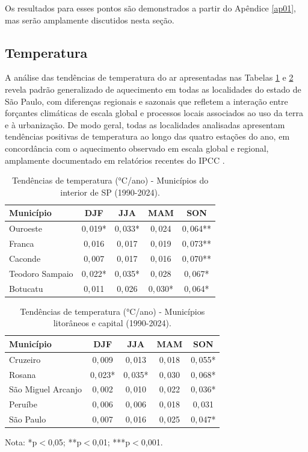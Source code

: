 Os resultados para esses pontos são demonstrados a partir do Apêndice \ref{ap01}, mas serão amplamente discutidos nesta seção.
\newpage
\subsection{Temperatura}

A análise das tendências de temperatura do ar apresentadas nas Tabelas \ref{tab:tendencias_temp_sp_a} e \ref{tab:tendencias_temp_sp_b} revela padrão generalizado de aquecimento em todas as localidades do estado de São Paulo, com diferenças regionais e sazonais que refletem a interação entre forçantes climáticas de escala global e processos locais associados ao uso da terra e à urbanização. De modo geral, todas as localidades analisadas apresentam tendências positivas de temperatura ao longo das quatro estações do ano, em concordância com o aquecimento observado em escala global e regional, amplamente documentado em relatórios recentes do IPCC \citep{ipcc2021}.

\begin{table}[H]
	\centering
	\caption{Tendências de temperatura (°C/ano) - Municípios do interior de SP (1990-2024).}
	\label{tab:tendencias_temp_sp_a}
	\small
	\begin{tabular}{lcccc}
		\hline
		\textbf{Município} & \textbf{DJF} & \textbf{JJA} & \textbf{MAM} & \textbf{SON} \\
		\hline
		Ouroeste & 0${,}$019*& 0${,}$033*& 0${,}$024& 0${,}$064** \\
		Franca& 0${,}$016& 0${,}$017& 0${,}$019& 0${,}$073** \\
		Caconde  & 0${,}$007& 0${,}$017& 0${,}$016& 0${,}$070** \\
		Teodoro Sampaio & 0${,}$022*& 0${,}$035*& 0${,}$028& 0${,}$067*\\
		Botucatu   & 0${,}$011& 0${,}$026& 0${,}$030*& 0${,}$064*\\
		\hline
	\end{tabular}
\end{table}

\begin{table}[H]
	\centering
	\caption{Tendências de temperatura (°C/ano) - Municípios litorâneos e capital (1990-2024).}
	\label{tab:tendencias_temp_sp_b}
	\small
	\begin{tabular}{lcccc}
		\hline
		\textbf{Município} & \textbf{DJF} & \textbf{JJA} & \textbf{MAM} & \textbf{SON} \\
		\hline
		Cruzeiro& 0${,}$009& 0${,}$013& 0${,}$018& 0${,}$055*\\
		Rosana   & 0${,}$023*& 0${,}$035*& 0${,}$030& 0${,}$068*\\
		São Miguel Arcanjo & 0${,}$002& 0${,}$010& 0${,}$022& 0${,}$036*\\
		Peruíbe   & 0${,}$006& 0${,}$006& 0${,}$018& 0${,}$031\\
		São Paulo & 0${,}$007& 0${,}$016& 0${,}$025& 0${,}$047*
		\hline
	\end{tabular}
	\vspace{2mm}
	
	{\footnotesize Nota: *p$<$0,05; **p$<$0,01; ***p$<$0,001.}
\end{table}


